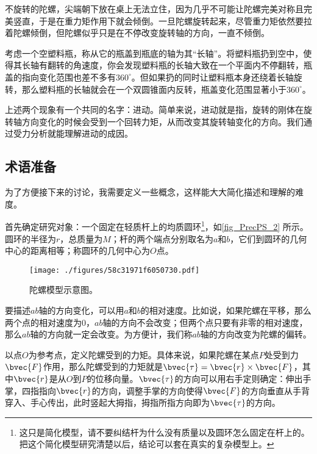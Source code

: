 

不旋转的陀螺，尖端朝下放在桌上无法立住，因为几乎不可能让陀螺完美对称且完美竖直，于是在重力矩作用下就会倾倒。一旦陀螺旋转起来，尽管重力矩依然要拉着陀螺倾倒，但陀螺似乎只是在不停改变旋转轴的方向，一直不倾倒。

考虑一个空塑料瓶，称从它的瓶盖到瓶底的轴为其“长轴”。将塑料瓶扔到空中，使得其长轴有翻转的角速度，你会发现塑料瓶的长轴大致在一个平面内不停翻转，瓶盖的指向变化范围也差不多有$360^\circ$。但如果扔的同时让塑料瓶本身还绕着长轴旋转，那么塑料瓶的长轴就会在一个双圆锥面内反转，瓶盖变化范围显著小于$360^\circ$。

上述两个现象有一个共同的名字：进动。简单来说，进动就是指，旋转的刚体在旋转轴方向变化的时候会受到一个回转力矩，从而改变其旋转轴变化的方向。我们通过受力分析就能理解进动的成因。


\subsection{术语准备}


为了方便接下来的讨论，我需要定义一些概念，这样能大大简化描述和理解的难度。


首先确定研究对象：一个固定在轻质杆上的均质圆环\footnote{这只是简化模型，请不要纠结杆为什么没有质量以及圆环怎么固定在杆上的。把这个简化模型研究清楚以后，结论可以套在真实的复杂模型上。}，如\autoref{fig_PrecPS_2} 所示。圆环的半径为$r$，总质量为$M$；杆的两个端点分别取名为$a$和$b$，它们到圆环的几何中心的距离相等；称圆环的几何中心为$O$点。



\begin{figure}[ht]
\centering
\texttt{[image: ./figures/58c31971f6050730.pdf]}
\caption{陀螺模型示意图。} \label{fig_PrecPS_2}
\end{figure}



要描述$ab$轴的方向变化，可以用$a$和$b$的相对速度。比如说，如果陀螺在平移，那么两个点的相对速度为$0$，$ab$轴的方向不会改变；但两个点只要有非零的相对速度，那么$ab$轴的方向就一定会改变。为方便计，我们称$ab$轴的方向改变为陀螺的偏转。


以点$O$为参考点，定义陀螺受到的力矩。具体来说，如果陀螺在某点$P$处受到力$\bvec{F}$作用，那么陀螺受到的力矩就是$\bvec{\tau}=\bvec{r}\times \bvec{F}$，其中$\bvec{r}$是从$O$到$P$的位移向量。$\bvec{\tau}$的方向可以用右手定则确定：伸出手掌，四指指向$\bvec{r}$的方向，调整手掌的方向使得$\bvec{F}$的方向垂直从手背穿入、手心传出，此时竖起大拇指，拇指所指方向即为$\bvec{\tau}$的方向。



